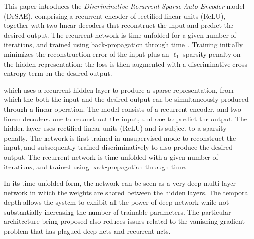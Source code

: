 \documentclass{article} %
\begin{document}

This paper introduces the \emph{Discriminative Recurrent Sparse Auto-Encoder} model (DrSAE), comprising a recurrent encoder of rectified linear units (ReLU), together with two linear decoders that reconstruct the input and predict the desired output.  The recurrent network is time-unfolded for a given number of iterations, and trained using back-propagation through time~\citep{rumelhart1986}.  Training initially minimizes the reconstruction error of the input plus an $\ell_1$ sparsity penalty on the hidden representation; the loss is then augmented with a discriminative cross-entropy term on the desired output.  

which uses a recurrent hidden layer to produce a sparse representation, from which the both the input and the desired output can be simultaneously produced through a linear operation. 
The model consists of a recurrent encoder, and two linear decoders: one to reconstruct the input, and one to predict the output. The hidden layer uses rectified linear units (ReLU) and is subject to a sparsity penalty. The network is first trained in unsupervised mode to reconstruct the input, and subsequently trained discriminatively to also produce the desired output. The recurrent network is time-unfolded with a given number of iterations, and trained using back-propagation through time. 

In its time-unfolded form, the network can be seen as a very deep multi-layer network in which the weights are shared between the hidden layers. The temporal depth allows the system to exhibit all the power of deep network while not substantially increasing the number of trainable parameters. The particular architecture being proposed also reduces issues related to the vanishing gradient problem that has plagued deep nets and recurrent nets.  
\end{document}
